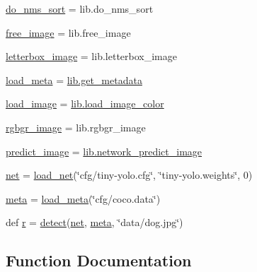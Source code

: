 \begin{DoxyCompactItemize}
\item 
\mbox{\hyperlink{namespacedarknet_ac69cf6b9f363f348b3f05e4ad183a873}{do\+\_\+nms\+\_\+sort}} = lib.\+do\+\_\+nms\+\_\+sort
\item 
\mbox{\hyperlink{namespacedarknet_a8eecbd375bf2071e9b556831ed48f2f7}{free\+\_\+image}} = lib.\+free\+\_\+image
\item 
\mbox{\hyperlink{namespacedarknet_aa8b324fa30fff311e68940259d0862d6}{letterbox\+\_\+image}} = lib.\+letterbox\+\_\+image
\item 
\mbox{\hyperlink{namespacedarknet_a967ea7e67a7760d5896e68e55ca2211a}{load\+\_\+meta}} = \mbox{\hyperlink{option__list_8c_a0aa1199eab9115fa8cef99bb01695663}{lib.\+get\+\_\+metadata}}
\item 
\mbox{\hyperlink{namespacedarknet_abdfbf2bd90fef694ab30ca75879a5f27}{load\+\_\+image}} = \mbox{\hyperlink{image_8c_a233b57091bac94f82d8aa0d8a5c1f070}{lib.\+load\+\_\+image\+\_\+color}}
\item 
\mbox{\hyperlink{namespacedarknet_ad1fa5910113bff57cabbe2907cf09904}{rgbgr\+\_\+image}} = lib.\+rgbgr\+\_\+image
\item 
\mbox{\hyperlink{namespacedarknet_a23869a65defd0266abc31c599b99f94b}{predict\+\_\+image}} = \mbox{\hyperlink{network_8c_a4b4357e916774cc72d7a37ec35a1e1ba}{lib.\+network\+\_\+predict\+\_\+image}}
\item 
\mbox{\hyperlink{namespacedarknet_adc6a45d045e33aea7cdb3d217a6a7d35}{net}} = \mbox{\hyperlink{namespacedarknet_aec4fa651fbaf4fa7a43642897d7763c0}{load\+\_\+net}}(\char`\"{}cfg/tiny-\/yolo.\+cfg\char`\"{}, \char`\"{}tiny-\/yolo.\+weights\char`\"{}, 0)
\item 
\mbox{\hyperlink{namespacedarknet_ae61a1edabe435136c755d64a6183a9c0}{meta}} = \mbox{\hyperlink{namespacedarknet_a967ea7e67a7760d5896e68e55ca2211a}{load\+\_\+meta}}(\char`\"{}cfg/coco.\+data\char`\"{})
\item 
def \mbox{\hyperlink{namespacedarknet_aa63511145b33161bf394732457420be6}{r}} = \mbox{\hyperlink{namespacedarknet_a7d3eaf0113e0b328013aa81edaad9f91}{detect}}(\mbox{\hyperlink{namespacedarknet_adc6a45d045e33aea7cdb3d217a6a7d35}{net}}, \mbox{\hyperlink{namespacedarknet_ae61a1edabe435136c755d64a6183a9c0}{meta}}, \char`\"{}data/dog.\+jpg\char`\"{})
\end{DoxyCompactItemize}


\subsection{Function Documentation}
\mbox{\label{namespacedarknet_a93a1a223ce8f666f922866b31af77b38}} 
